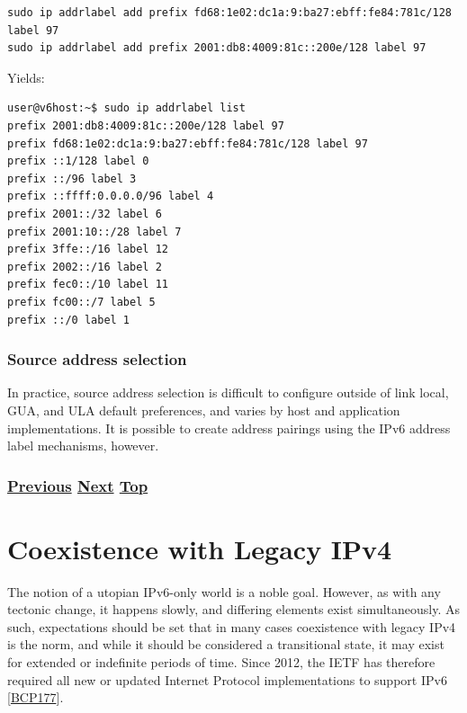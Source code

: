 \documentclass[
]{article}
\begin{document}
\begin{verbatim}
sudo ip addrlabel add prefix fd68:1e02:dc1a:9:ba27:ebff:fe84:781c/128 label 97
sudo ip addrlabel add prefix 2001:db8:4009:81c::200e/128 label 97
\end{verbatim}

Yields:

\begin{verbatim}
user@v6host:~$ sudo ip addrlabel list
prefix 2001:db8:4009:81c::200e/128 label 97
prefix fd68:1e02:dc1a:9:ba27:ebff:fe84:781c/128 label 97
prefix ::1/128 label 0
prefix ::/96 label 3
prefix ::ffff:0.0.0.0/96 label 4
prefix 2001::/32 label 6
prefix 2001:10::/28 label 7
prefix 3ffe::/16 label 12
prefix 2002::/16 label 2
prefix fec0::/10 label 11
prefix fc00::/7 label 5
prefix ::/0 label 1
\end{verbatim}

\subsubsection{Source address selection}\label{source-address-selection}

In practice, source address selection is difficult to configure outside
of link local, GUA, and ULA default preferences, and varies by host and
application implementations. It is possible to create address pairings
using the IPv6 address label mechanisms, however.

\subsubsection{\texorpdfstring{\hyperref[traffic-class-and-flow-label]{Previous}
\hyperref[coexistence-with-legacy-ipv4]{Next}
\hyperref[ipv6-basic-technology]{Top}}{Previous Next Top}}\label{previous-next-top-19}

\pagebreak

\section{Coexistence with Legacy
IPv4}\label{coexistence-with-legacy-ipv4}

The notion of a utopian IPv6-only world is a noble goal. However, as
with any tectonic change, it happens slowly, and differing elements
exist simultaneously. As such, expectations should be set that in many
cases coexistence with legacy IPv4 is the norm, and while it should be
considered a transitional state, it may exist for extended or indefinite
periods of time. Since 2012, the IETF has therefore required all new or
updated Internet Protocol implementations to support IPv6
{[}\href{https://www.rfc-editor.org/info/bcp177}{BCP177}{]}.
\end{document}
